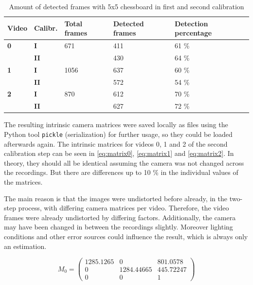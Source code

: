 \begin{table}[h]
    \centering
    \begin{tabular}{|l|l|l|l|l|}
        \hline
        \textbf{Video} & \textbf{Calibr.} & \textbf{Total frames}     & \textbf{Detected frames}                          & \textbf{Detection percentage}                    \\ \hline
        \textbf{0} & \textbf{I} & 671 & 411  & 61 \% \\ \hline
         & \textbf{II} &  & 430  & 64 \% \\ \hline
        \textbf{1} & \textbf{I} & 1056 & 637  & 60 \% \\ \hline
         & \textbf{II} &  & 572  & 54 \% \\ \hline
        \textbf{2} & \textbf{I} & 870 & 612  & 70 \% \\ \hline
         & \textbf{II} &  & 627  & 72 \% \\ \hline
        \end{tabular}
    \caption{Amount of detected frames with 5x5 chessboard in first and second calibration}
    \label{tbl:detectedframes}
\end{table}

The resulting intrinsic camera matrices were saved locally as files using the Python tool \texttt{pickle} (serialization) for further usage, so they could be loaded afterwards again. The intrinsic matrices for videos 0, 1 and 2 of the second calibration step can be seen in \autoref{eq:matrix0}, \autoref{eq:matrix1} and \autoref{eq:matrix2}. In theory, they should all be identical assuming the camera was not changed across the recordings. But there are differences up to 10 \% in the individual values of the matrices.

The main reason is that the images were undistorted before already, in the two-step process, with differing camera matrices per video. Therefore, the video frames were already undistorted by differing factors. Additionally, the camera may have been changed in between the recordings slightly. Moreover lighting conditions and other error sources could influence the result, which is always only an estimation.

\begin{equation} \label{eq:matrix0}
    M_0 =
    \begin{pmatrix}
        1285.1265 & 0 & 801.0578\\
        0 & 1284.44665 & 445.72247\\
        0 & 0 & 1
    \end{pmatrix}
\end{equation}

